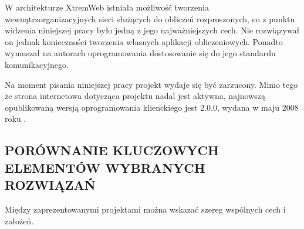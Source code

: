 \documentclass[12pt,a4paper,twoside]{article}
\begin{document}
W architekturze XtremWeb istniała możliwość tworzenia wewnątrzorganizacyjnych sieci służących do obliczeń rozproszonych, co z punktu widzenia niniejszej pracy było jedną z jego najważniejszych cech. Nie rozwiązywał on jednak konieczności tworzenia własnych aplikacji obliczeniowych. Ponadto wymuszał na autorach oprogramowania dostosowanie się do jego standardu komunikacyjnego.

Na moment pisania niniejszej pracy projekt wydaje się być zarzucony. Mimo tego że strona internetowa dotycząca projektu nadal jest aktywna, najnowszą opublikowaną wersją oprogramowania klienckiego jest 2.0.0, wydana w maju 2008 roku \cite{xtremwebforge}.

\subsection{PORÓWNANIE KLUCZOWYCH ELEMENTÓW WYBRANYCH ROZWIĄZAŃ}

Między zaprezentowanymi projektami można wskazać szereg wspólnych cech i założeń.
\end{document}
